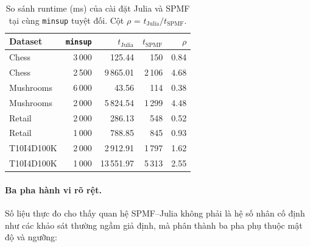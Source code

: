 \begin{table}[htbp]
    \centering
    \caption{So sánh runtime (ms) của cài đặt Julia và SPMF tại cùng \texttt{minsup} tuyệt đối. Cột $\rho$ = $t_{\text{Julia}}/t_{\text{SPMF}}$.}
    \label{tab:exp-b-spmf}
    \begin{tabular}{l|r|r|r|r}
        \hline
        \textbf{Dataset} & \texttt{minsup} & $t_{\text{Julia}}$ & $t_{\text{SPMF}}$ & $\rho$ \\ \hline
        Chess       & 3\,000 & 125.44    & 150      & 0.84 \\
        Chess       & 2\,500 & 9\,865.01 & 2\,106   & 4.68 \\
        Mushrooms   & 6\,000 & 43.56     & 114      & 0.38 \\
        Mushrooms   & 2\,000 & 5\,824.54 & 1\,299   & 4.48 \\
        Retail      & 2\,000 & 286.13    & 548      & 0.52 \\
        Retail      & 1\,000 & 788.85    & 845      & 0.93 \\
        T10I4D100K  & 2\,000 & 2\,912.91 & 1\,797   & 1.62 \\
        T10I4D100K  & 1\,000 & 13\,551.97 & 5\,313  & 2.55 \\
        \hline
    \end{tabular}
\end{table}

\paragraph{Ba pha hành vi rõ rệt.} Số liệu thực đo cho thấy quan hệ SPMF--Julia không phải là hệ số nhân cố định như các khảo sát thường ngầm giả định, mà phân thành ba pha phụ thuộc mật độ và ngưỡng:

